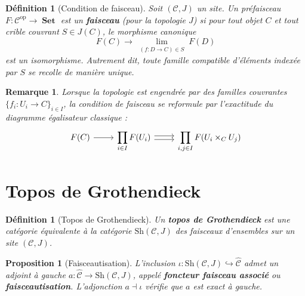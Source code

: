 \documentclass[a4paper,12pt]{book}
\DeclareMathOperator{\Set}{\mathbf{Set}}
\newcommand{\op}{\mathrm{op}}
\newtheorem{proposition}[theoreme]{Proposition}
\newtheorem{definition}[theoreme]{Définition}
\newtheorem*{remarque}{Remarque}
\begin{document}
\begin{definition}[Condition de faisceau]\label{def:faisceau-site}
Soit $(\mathcal{C}, J)$ un site.  Un préfaisceau
$F \colon \mathcal{C}^\op \to \Set$ est un \textbf{faisceau}
(pour la topologie $J$) si pour tout objet $C$ et tout crible
couvrant $S \in J(C)$, le morphisme canonique
\[
  F(C) \longrightarrow \lim_{\substack{(f \colon D \to C) \in S}} F(D)
\]
est un isomorphisme.  Autrement dit, toute famille compatible d'éléments
indexée par $S$ se recolle de manière unique.
\end{definition}

\begin{remarque}\label{rem:faisceau-egalisateur}
Lorsque la topologie est engendrée par des familles couvrantes
$\{f_i \colon U_i \to C\}_{i \in I}$, la condition de faisceau
se reformule par l'exactitude du diagramme égalisateur classique :
\[
\begin{tikzcd}
F(C) \arrow[r] &
\displaystyle\prod_{i \in I} F(U_i)
  \arrow[r, shift left=0.5ex]
  \arrow[r, shift right=0.5ex] &
\displaystyle\prod_{i,j \in I} F(U_i \times_C U_j)
\end{tikzcd}
\]
\end{remarque}

\section{Topos de Grothendieck}\label{sec:topos-grothendieck}

\begin{definition}[Topos de Grothendieck]\label{def:topos-grothendieck}
Un \textbf{topos de Grothendieck} est une catégorie équivalente
à la catégorie $\mathrm{Sh}(\mathcal{C}, J)$ des faisceaux d'ensembles
sur un site $(\mathcal{C}, J)$.
\end{definition}

\begin{proposition}[Faisceautisation]\label{prop:faisceautisation}
L'inclusion $\iota \colon \mathrm{Sh}(\mathcal{C}, J) \hookrightarrow
\widehat{\mathcal{C}}$ admet un adjoint à gauche
$a \colon \widehat{\mathcal{C}} \to \mathrm{Sh}(\mathcal{C}, J)$,
appelé \textbf{foncteur faisceau associé} ou \textbf{faisceautisation}.
L'adjonction $a \dashv \iota$ vérifie que $a$ est exact à gauche.
\end{proposition}
\end{document}
